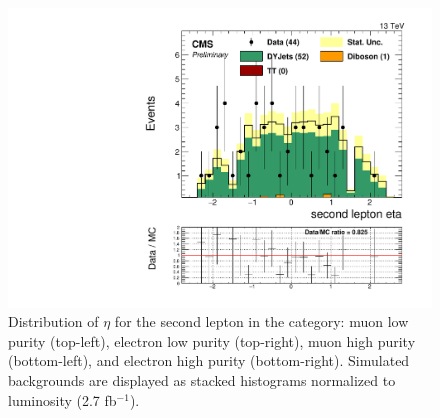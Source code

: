 \begin{figure}[h]
\begin{center}
\includegraphics[scale=0.37]{figures/control/etalep2EHP.pdf}
\caption[Distribution of $\eta$ for the second lepton]{Distribution of $\eta$ for the second lepton in the category: muon low purity (top-left), electron low purity (top-right), muon high purity (bottom-left), and  electron high purity (bottom-right). Simulated backgrounds are displayed as stacked histograms normalized to luminosity (2.7 fb$^{-1}$).}
\label{etalep2_VZ}
\end{center}
\end{figure}

